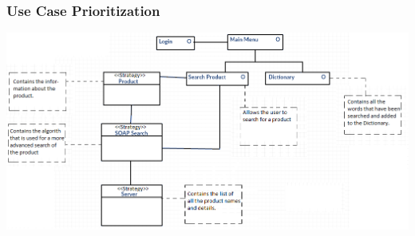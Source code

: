 \documentclass[a4paper,10pt]{article}
\begin{document}
	\subsubsection{Use Case Prioritization} 
		 \includegraphics[scale=0.62]{Diagrams/ClassDiagramUpdatedWithDesign.png}\\
\end{document}

